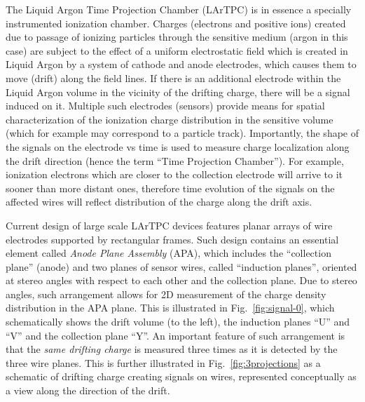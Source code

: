 The Liquid Argon Time Projection Chamber (LArTPC) is in essence a specially instrumented ionization chamber. Charges (electrons and positive ions)
created due to passage of ionizing particles through the sensitive medium (argon in this case) are subject to the effect of a uniform electrostatic
field which is created in Liquid Argon by a system of cathode and anode electrodes, which causes them to move (drift) along the field lines.
If there is an additional electrode within the Liquid Argon volume in the vicinity of the drifting charge, there will be a signal induced on it. Multiple such
electrodes (sensors) provide means for spatial characterization of the ionization charge distribution in the sensitive volume (which for example may
correspond to a particle track). Importantly, the shape of the signals on the electrode vs time is used to measure charge localization along the drift
direction (hence the term ``Time Projection Chamber''). For example, ionization electrons which are closer to the collection electrode will arrive to it sooner than
more distant ones, therefore time evolution of the signals on the affected wires will reflect distribution of the charge along the drift axis.

Current design of large scale LArTPC devices features planar arrays of wire electrodes supported by
rectangular frames. Such design contains an essential element called \textit{Anode Plane Assembly} (APA), which includes the ``collection plane'' (anode)
and two planes of sensor wires, called ``induction planes'', oriented at stereo angles with respect to each other and the collection plane.
Due to stereo angles, such arrangement allows for 2D measurement of the charge density distribution in the APA plane.
This is illustrated in Fig.~\ref{fig:signal-0}, which schematically shows the drift volume (to the left), the induction planes ``U'' and ``V'' and
the collection plane ``Y''. An important feature of such arrangement is that the \textit{same drifting charge} is measured three times as it
is detected by the three wire planes. This is further illustrated in Fig.~\ref{fig:3projections} as a schematic of drifting charge creating signals on wires,
represented conceptually as a view along the direction of the drift.

